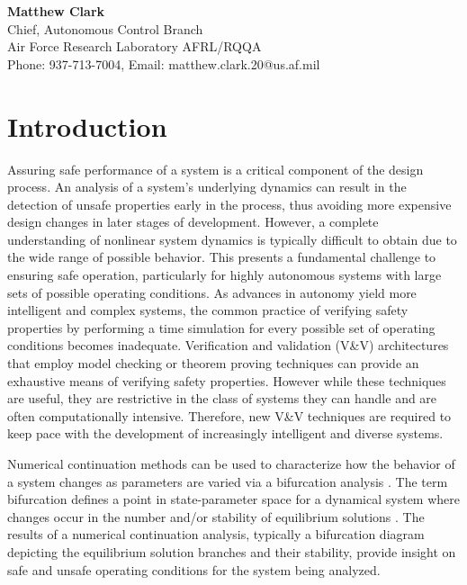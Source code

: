 \documentclass[12pt]{article}
\begin{document}
\begin{center}
\textbf{Matthew Clark}\\Chief, Autonomous Control Branch\\Air Force Research Laboratory AFRL/RQQA\\Phone: 937-713-7004, Email:  matthew.clark.20@us.af.mil
\end{center}

\newpage

\section{Introduction}

Assuring safe performance of a system is a critical component of the design process. An analysis of a system's underlying dynamics can result in the detection of unsafe properties early in the process, thus avoiding more expensive design changes in later stages of development. However, a complete understanding of nonlinear system dynamics is typically difficult to obtain due to the wide range of possible behavior. This presents a fundamental challenge to ensuring safe operation, particularly for highly autonomous systems with large sets of possible operating conditions. As advances in autonomy yield more intelligent and complex systems, the common practice of verifying safety properties by performing a time simulation for every possible set of operating conditions becomes inadequate. Verification and validation (V\&V) architectures that employ model checking or theorem proving techniques can provide an exhaustive means of verifying safety properties. However while these techniques are useful, they are restrictive in the class of systems they can handle and are often computationally intensive. Therefore, new V\&V techniques are required to keep pace with the development of increasingly intelligent and diverse systems. 

Numerical continuation methods can be used to characterize how the behavior of a system changes as parameters are varied via a bifurcation analysis \cite{allgower}. The term bifurcation defines a point in state-parameter space for a dynamical system where changes occur in the number and/or stability of equilibrium solutions \cite{strogatz}. The results of a numerical continuation analysis, typically a bifurcation diagram depicting the equilibrium solution branches and their stability, provide insight on safe and unsafe operating conditions for the system being analyzed.
\end{document}

